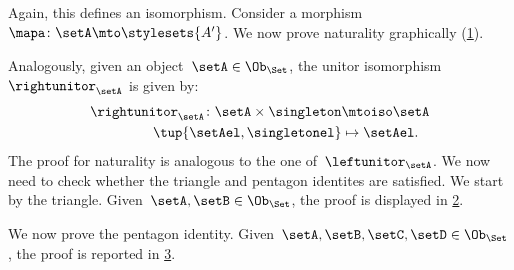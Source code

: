\begin{example}
  Again, this defines an isomorphism.
  Consider a morphism~$\mapa\colon \setA\mto \stylesets{A'}$.
  We now prove naturality graphically (\cref{fig:monoidal_set_unit_nat}).

  \begin{figure}[h!]
    \begin{center}
    \end{center}
    \caption{\label{fig:monoidal_set_unit_nat}}
  \end{figure}

  Analogously, given an object~$\setA\in \Ob_{\Set}$, the unitor isomorphism~$\rightunitor_\setA$ is given by:
  \begin{equation*}
      \label{eq:set_mon_prod_5}
    \begin{aligned}
      \rightunitor_\setA\colon \setA\times \singleton &\mtoiso \setA\\
      \tup{\setAel,\singletonel}&\mapsto \setAel.
    \end{aligned}
  \end{equation*}
  The proof for naturality is analogous to the one of~$\leftunitor_\setA$.
  We now need to check whether the triangle and pentagon identites are satisfied.
  We start by the triangle. Given~$\setA,\setB\in \Ob_{\Set}$, the proof is displayed in \cref{fig:set_mon_triangle}.

  \begin{figure}[h]
    \begin{center}
    \end{center}
    \caption{\label{fig:set_mon_triangle}}
  \end{figure}

  We now prove the pentagon identity. Given~$\setA,\setB,\setC,\setD\in \Ob_\Set$, the proof is reported in \cref{fig:set_mon_pent}.

  \begin{figure}[h]
    \begin{center}
    \end{center}
    \caption{\label{fig:set_mon_pent}}
  \end{figure}
\end{example}




